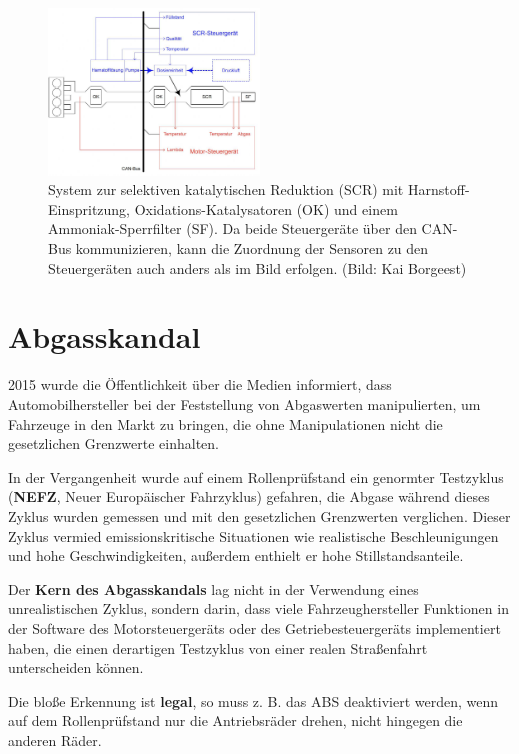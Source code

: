 \begin{figure}[!ht]%
\centering
\includegraphics[width=0.5\textwidth]{images/EDC/EDC-14.pdf}
\caption{System zur selektiven katalytischen Reduktion (SCR) mit
Harnstoff-Einspritzung, Oxidations-Katalysatoren (OK) und einem
Ammoniak-Sperrfilter (SF). Da beide Steuergeräte über den CAN-Bus
kommunizieren, kann die Zuordnung der Sensoren zu den Steuergeräten auch
anders als im Bild erfolgen. (Bild: Kai Borgeest)}
\end{figure}

\newpage

\section{Abgasskandal}\label{abgasskandal}

2015 wurde die Öffentlichkeit über die Medien informiert, dass
Automobilhersteller bei der Feststellung von Abgaswerten manipulierten,
um Fahrzeuge in den Markt zu bringen, die ohne Manipulationen nicht die
gesetzlichen Grenzwerte einhalten.

In der Vergangenheit wurde auf einem Rollenprüfstand ein genormter
Testzyklus (\textbf{NEFZ}, Neuer Europäischer Fahrzyklus) gefahren, die
Abgase während dieses Zyklus wurden gemessen und mit den gesetzlichen
Grenzwerten verglichen. Dieser Zyklus vermied emissionskritische
Situationen wie realistische Beschleunigungen und hohe
Geschwindigkeiten, außerdem enthielt er hohe Stillstandsanteile.

Der \textbf{Kern des Abgasskandals} lag nicht in der Verwendung eines
unrealistischen Zyklus, sondern darin, dass viele Fahrzeughersteller
Funktionen in der Software des Motorsteuergeräts oder des
Getriebesteuergeräts implementiert haben, die einen derartigen
Testzyklus von einer realen Straßenfahrt unterscheiden können.

Die bloße Erkennung ist \textbf{legal}, so muss z. B. das ABS
deaktiviert werden, wenn auf dem Rollenprüfstand nur die Antriebsräder
drehen, nicht hingegen die anderen Räder.

